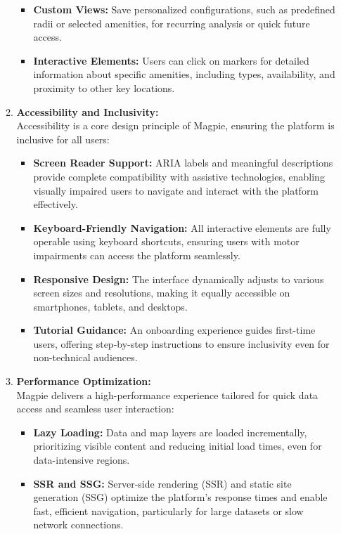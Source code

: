 \begin{enumerate}
\begin{enumerate}
\begin{itemize}
            \item \textbf{Custom Views:} Save personalized configurations, such as predefined radii or selected amenities, for recurring analysis or quick future access.
            \item \textbf{Interactive Elements:} Users can click on markers for detailed information about specific amenities, including types, availability, and proximity to other key locations.
        \end{itemize}
        \item \textbf{Accessibility and Inclusivity:}\\
        Accessibility is a core design principle of Magpie, ensuring the platform is inclusive for all users:
        \begin{itemize}
            \item \textbf{Screen Reader Support:} ARIA labels and meaningful descriptions provide complete compatibility with assistive technologies, enabling visually impaired users to navigate and interact with the platform effectively.
            \item \textbf{Keyboard-Friendly Navigation:} All interactive elements are fully operable using keyboard shortcuts, ensuring users with motor impairments can access the platform seamlessly.
            \item \textbf{Responsive Design:} The interface dynamically adjusts to various screen sizes and resolutions, making it equally accessible on smartphones, tablets, and desktops.
            \item \textbf{Tutorial Guidance:} An onboarding experience guides first-time users, offering step-by-step instructions to ensure inclusivity even for non-technical audiences.
        \end{itemize}
        \item \textbf{Performance Optimization:}\\
        Magpie delivers a high-performance experience tailored for quick data access and seamless user interaction:
        \begin{itemize}
            \item \textbf{Lazy Loading:} Data and map layers are loaded incrementally, prioritizing visible content and reducing initial load times, even for data-intensive regions.
            \item \textbf{SSR and SSG:} Server-side rendering (SSR) and static site generation (SSG) optimize the platform’s response times and enable fast, efficient navigation, particularly for large datasets or slow network connections.

\end{itemize}
\end{enumerate}
\end{enumerate}
